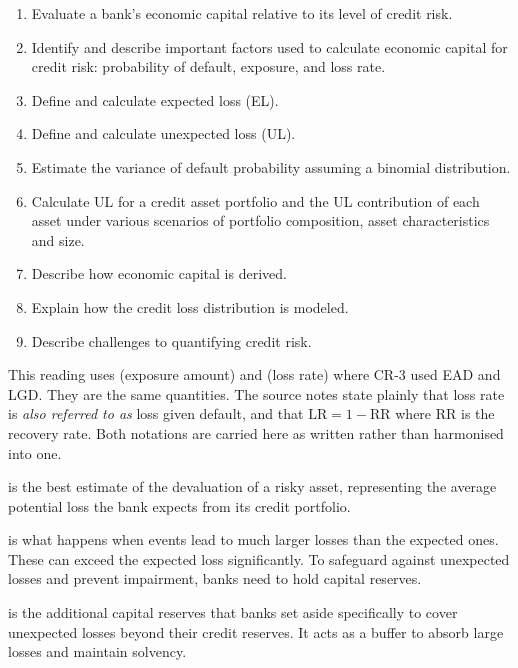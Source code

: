 
\begin{crkeybox}
\begin{enumerate}[label=\textbf{\alph*.},leftmargin=2em]
\item Evaluate a bank's economic capital relative to its level of credit risk.
\item Identify and describe important factors used to calculate economic capital for credit risk: probability of default, exposure, and loss rate.
\item Define and calculate expected loss (EL).
\item Define and calculate unexpected loss (UL).
\item Estimate the variance of default probability assuming a binomial distribution.
\item Calculate UL for a credit asset portfolio and the UL contribution of each asset under various scenarios of portfolio composition, asset characteristics and size.
\item Describe how economic capital is derived.
\item Explain how the credit loss distribution is modeled.
\item Describe challenges to quantifying credit risk.
\end{enumerate}
\end{crkeybox}

\begin{crtrapbox}
This reading uses  (exposure amount) and  (loss rate) where
CR-3 used EAD and LGD. They are the same quantities. The source notes state
plainly that loss rate is \emph{also referred to as} loss given default, and that
$\mathrm{LR} = 1 - \mathrm{RR}$ where RR is the recovery rate. Both notations are
carried here as written rather than harmonised into one.
\end{crtrapbox}


\begin{crdefbox}
 is the best estimate of the devaluation of a risky
asset, representing the average potential loss the bank expects from its credit
portfolio.

\smallskip
{} is what happens when events lead to much larger
losses than the expected ones. These can exceed the expected loss significantly.
To safeguard against unexpected losses and prevent impairment, banks need to hold
capital reserves.

\smallskip
{} is the additional capital reserves that banks set aside
specifically to cover unexpected losses beyond their credit reserves. It acts as
a buffer to absorb large losses and maintain solvency.
\end{crdefbox}

